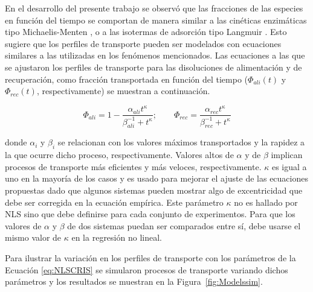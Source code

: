 En el desarrollo del presente trabajo se observó que las fracciones de las especies en función del tiempo se comportan de manera similar a las cinéticas enzimáticas tipo Michaelis-Menten \citep{Johnson2011}, o a las isotermas de adsorción tipo Langmuir \citep{Atkins}. Esto sugiere que los perfiles de transporte pueden ser modelados con ecuaciones similares a las utilizadas en los fenómenos mencionados. Las ecuaciones a las que se ajustaron los perfiles de transporte para las disoluciones de alimentación y de recuperación, como fracción transportada en función del tiempo ($\Phi_{ali}(t)$ y $\Phi_{rec}(t)$, respectivamente) se muestran a continuación.

\begin{equation}\label{eq:NLSCRIS}
    \Phi_{ali}=1-\frac{\alpha_{ali} t^\kappa}{\beta_{ali}^{-1}+t^\kappa};\qquad\Phi_{rec}=\frac{\alpha_{rec} t^\kappa}{\beta_{rec}^{-1}+t^\kappa}
\end{equation}

donde $\alpha_i$ y $\beta_i$ se relacionan con los valores máximos transportados y la rapidez a la que ocurre dicho proceso, respectivamente. Valores altos de $\alpha$ y de $\beta$ implican procesos de transporte más eficientes y más veloces, respectivamente. $\kappa$ es igual a uno en la mayoría de los casos y es usado para mejorar el ajuste de las ecuaciones propuestas dado que algunos sistemas pueden mostrar algo de excentricidad que debe ser corregida en la ecuación empírica. Este parámetro $\kappa$ no es hallado por \ac{NLS} sino que debe definirse para cada conjunto de experimentos. Para que los valores de $\alpha$ y $\beta$ de dos sistemas puedan ser comparados entre sí, debe usarse el mismo valor de $\kappa$ en la regresión no lineal.


Para ilustrar la variación en los perfiles de transporte con los parámetros de la Ecuación \ref{eq:NLSCRIS} se simularon procesos de transporte variando dichos parámetros y los resultados se muestran en la Figura~\ref{fig:Modelssim}.

